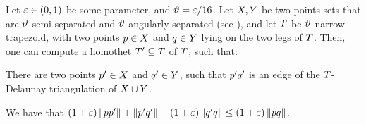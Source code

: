 \documentclass[12pt]{article}%
\begin{document}
\begin{lemma}
    Let $\varepsilon \in (0,1)$ be some parameter, and $\vartheta = \varepsilon/16$.
    Let $X,Y$ be two points sets that are $\vartheta$-semi separated
    and $\vartheta$-angularly separated (see ),
    and let $T$ be $\vartheta$-narrow trapezoid, with two points
    $p \in X$ and $q \in Y$ lying on the two legs of
    $T$. Then, one can compute a homothet $T' \subseteq T$
    of $T$, such that:
    \begin{compactenumI}
        \item There are two points $p' \in X$ and $q' \in Y$,
        such that $p'q'$ is an edge of the $T$-Delaunay
        triangulation of $X \cup Y$.

        \item We have that
        $(1+\varepsilon)\left\| p p' \right\| + \left\| p' q' \right\| + (1+\varepsilon)
        \left\| q' q \right\| \leq (1+\varepsilon) \left\| p q \right\|$.
    \end{compactenumI}
\end{lemma}
\end{document}
